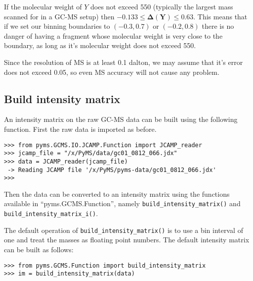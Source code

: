 If the molecular weight of \begin{math}Y\end{math} does not exceed 550 (typically the 
largest mass scanned for in a GC-MS setup) then \begin{math}\mathbf{-0.133 \leq \Delta(Y) 
\leq 0.63}\end{math}. This means that if we set our binning boundaries to 
\begin{math}(-0.3, 0.7)\end{math} or \begin{math}(-0.2, 0.8)\end{math} there is no danger 
of having a fragment whose molecular weight is very close to the boundary, as long as it's
molecular weight does not exceed 550.

Since the resolution of MS is at least 0.1 dalton, we may assume that it's error does not 
exceed 0.05, so even MS accuracy will not cause any problem. 

\subsection{Build intensity matrix}


An intensity matrix on the raw GC-MS data can be built using the following
function. First the raw data is imported as before.

\begin{verbatim}
>>> from pyms.GCMS.IO.JCAMP.Function import JCAMP_reader
>>> jcamp_file = "/x/PyMS/data/gc01_0812_066.jdx"
>>> data = JCAMP_reader(jcamp_file)
 -> Reading JCAMP file '/x/PyMS/pyms-data/gc01_0812_066.jdx'
>>>
\end{verbatim}

\noindent
Then the data can be converted to an intensity matrix using the functions
available in ``pyms.GCMS.Function'', namely {\tt build\_intensity\_matrix()}
and {\tt build\_intensity\_matrix\_i()}.

The default operation of {\tt build\_intensity\_matrix()} is to use a bin
interval of one and treat the masses as floating point numbers. The default
intensity matrix can be built as follows:

\begin{verbatim}
>>> from pyms.GCMS.Function import build_intensity_matrix
>>> im = build_intensity_matrix(data)
\end{verbatim}

